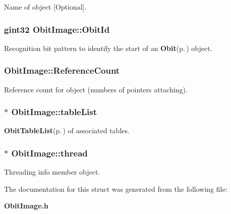 Name of object [Optional]. 

\subsubsection{\setlength{\rightskip}{0pt plus 5cm}gint32 {\bf Obit\-Image::Obit\-Id}}\label{structObitImage_o0}


Recognition bit pattern to identify the start of an {\bf Obit}{\rm (p.\,\pageref{structObit})} object. 

\subsubsection{ {\bf Obit\-Image::Reference\-Count}}\label{structObitImage_o2}


Reference count for object (numbers of pointers attaching). 

\subsubsection{$\ast$ {\bf Obit\-Image::table\-List}}\label{structObitImage_o9}


{\bf Obit\-Table\-List}{\rm (p.\,\pageref{structObitTableList})} of associated tables. 

\subsubsection{$\ast$ {\bf Obit\-Image::thread}}\label{structObitImage_o4}


Threading info member object. 



The documentation for this struct was generated from the following file:\begin{CompactItemize}
\item 
{\bf Obit\-Image.h}\end{CompactItemize}
